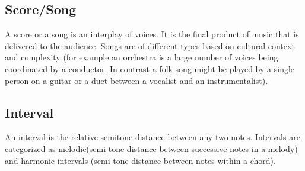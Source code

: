 \subsection{Score/Song}
\noindent A score or a song is an interplay of voices. It is the final product of music that is delivered to the audience. Songs are of different types based on cultural context and complexity (for example an orchestra is a large number of voices being coordinated by a conductor. In contrast a folk song might be played by a single person on a guitar or a duet between a vocalist and an instrumentalist). 

\subsection{Interval}
\noindent An interval is the relative semitone distance between any two notes. Intervals are categorized as melodic(semi tone distance between successive notes in a melody) and harmonic intervals (semi tone distance between notes within a chord). 